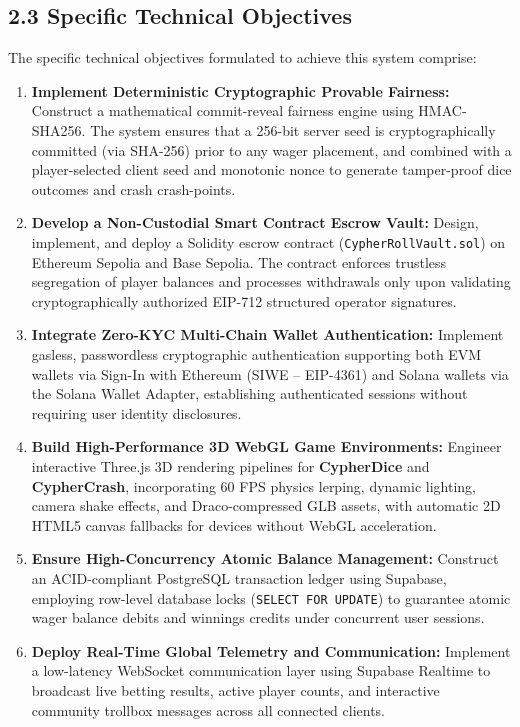 \subsection*{2.3 Specific Technical Objectives}
The specific technical objectives formulated to achieve this system comprise:
\begin{enumerate}[leftmargin=*]
    \item \textbf{Implement Deterministic Cryptographic Provable Fairness:} Construct a mathematical commit-reveal fairness engine using HMAC-SHA256. The system ensures that a 256-bit server seed is cryptographically committed (via SHA-256) prior to any wager placement, and combined with a player-selected client seed and monotonic nonce to generate tamper-proof dice outcomes and crash crash-points.
    
    \item \textbf{Develop a Non-Custodial Smart Contract Escrow Vault:} Design, implement, and deploy a Solidity escrow contract (\texttt{CypherRollVault.sol}) on Ethereum Sepolia and Base Sepolia. The contract enforces trustless segregation of player balances and processes withdrawals only upon validating cryptographically authorized EIP-712 structured operator signatures.
    
    \item \textbf{Integrate Zero-KYC Multi-Chain Wallet Authentication:} Implement gasless, passwordless cryptographic authentication supporting both EVM wallets via Sign-In with Ethereum (SIWE -- EIP-4361) and Solana wallets via the Solana Wallet Adapter, establishing authenticated sessions without requiring user identity disclosures.
    
    \item \textbf{Build High-Performance 3D WebGL Game Environments:} Engineer interactive Three.js 3D rendering pipelines for \textbf{CypherDice} and \textbf{CypherCrash}, incorporating 60 FPS physics lerping, dynamic lighting, camera shake effects, and Draco-compressed GLB assets, with automatic 2D HTML5 canvas fallbacks for devices without WebGL acceleration.
    
    \item \textbf{Ensure High-Concurrency Atomic Balance Management:} Construct an ACID-compliant PostgreSQL transaction ledger using Supabase, employing row-level database locks (\texttt{SELECT FOR UPDATE}) to guarantee atomic wager balance debits and winnings credits under concurrent user sessions.
    
    \item \textbf{Deploy Real-Time Global Telemetry and Communication:} Implement a low-latency WebSocket communication layer using Supabase Realtime to broadcast live betting results, active player counts, and interactive community trollbox messages across all connected clients.
    

\end{enumerate}
